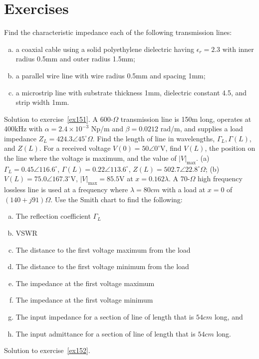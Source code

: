 \section{Exercises}
\begin{ExerciseList}
\Exercise[label={ex151}]
Find the characteristic impedance each of the following transmission lines:
\begin{enumerate}[(a)]
\item a coaxial cable using a solid polyethylene dielectric having $\epsilon_r = 2.3$ with inner radius 0.5mm and outer radius 1.5mm; 
\item a parallel wire line with wire radius 0.5mm and spacing 1mm; 
\item a microstrip line with substrate thickness 1mm, dielectric constant 4.5, and strip width 1mm.
\end{enumerate}
\Answer[ref={ex151}]
Solution to exercise~\ref{ex151}.
\Exercise[label={ex152}]
A 600-$\varOmega$ transmission line is 150m long, operates at 400kHz with $\alpha = 2.4\times 10^{-3}$ Np/m and $\beta = 0.0212$ rad/m, and supplies a load impedance $Z_L = 424.3\angle45^{\circ}\varOmega$. Find the length of line in wavelengths, $\Gamma_L, \Gamma(L)$, and $Z(L)$. For a received voltage $V(0) = 50\angle0^{\circ}$V, find $V(L)$, the position on the line where the voltage is maximum, and the value of $|V|_\max$.
\Answer[ref={ex152}]
(a) $\Gamma_L = 0.45\angle116.6^{\circ}$, $\Gamma(L) = 0.22\angle113.6^{\circ}$, $Z(L) = 502.7\angle22.8^{\circ}\varOmega$; (b) $V(L) = 75.0\angle167.3^{\circ}$V, $|V|_\max = 85.5$V at $x = 0.162\lambda$.
\Exercise[label={ex153}]
A 70-$\varOmega$ high frequency lossless line is used at a frequency where $\lambda = 80cm$ with a load at $x = 0$ of $(140 + j91)\varOmega$. Use the Smith chart to find the following:
\begin{enumerate}[(a)]
\item The reflection coefficient $\Gamma_L$ 
\item VSWR
\item The distance to the first voltage maximum from the load
\item The distance to the first voltage minimum from the load
\item The impedance at the first voltage maximum
\item The impedance at the first voltage minimum
\item The input impedance for a section of line of length that is $54cm$ long, and
\item The input admittance for a section of line of length that is $54cm$ long.
\end{enumerate}
\Answer[ref={ex153}]
Solution to exercise~\ref{ex152}.
\end{ExerciseList}